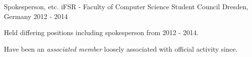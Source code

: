 

\begin{cventries}


\cventry
	{Spokesperson, etc.}
	{iFSR - Faculty of Computer Science Student Council}
	{Dresden, Germany}
	{2012 - 2014}
	{
		\begin{cvitems}
			\item {Held differing positions including spokesperson from 2012 - 2014.}
			\item {Have been an \emph{associated member} loosely associated with official activity since.}
		\end{cvitems}
	}
	

\end{cventries}

